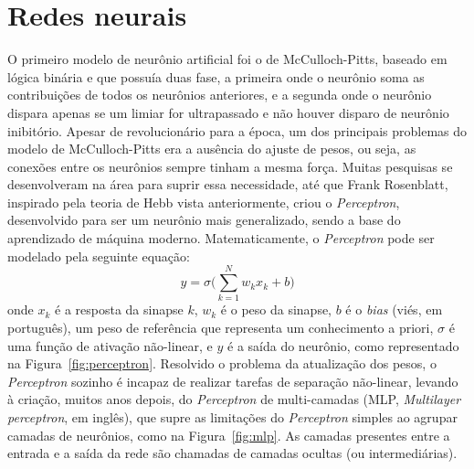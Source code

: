 \section{Redes neurais}\label{sec:redesneurais}
O primeiro modelo de neurônio artificial foi o de McCulloch-Pitts, baseado em lógica binária e que possuía duas fase, a primeira onde o neurônio soma as contribuições de todos os neurônios anteriores, e a segunda onde o neurônio dispara apenas se um limiar for ultrapassado e não houver disparo de neurônio inibitório.
Apesar de revolucionário para a época, um dos principais problemas do modelo de McCulloch-Pitts era a ausência do ajuste de pesos, ou seja, as conexões entre os neurônios sempre tinham a mesma força. Muitas pesquisas se desenvolveram na área para suprir essa necessidade, até que Frank Rosenblatt, inspirado pela teoria de Hebb vista anteriormente, criou o \textit{Perceptron},
desenvolvido para ser um neurônio mais generalizado, sendo a base do aprendizado de máquina moderno. Matematicamente, o \textit{Perceptron} pode ser modelado pela seguinte equação:
\begin{equation}\label{eq:perceptron}
	y=\sigma\Big(\sum_{k=1}^Nw_kx_k+b\Big)
\end{equation}
onde $x_k$ é a resposta da sinapse $k$, $w_k$ é o peso da sinapse, $b$ é o \textit{bias} (viés, em português), um peso de referência que representa um conhecimento a priori, %
$\sigma$ é uma função de ativação não-linear, e $y$ é a saída do neurônio, como representado na Figura~\ref{fig:perceptron}. Resolvido o problema da atualização dos pesos, o \textit{Perceptron} sozinho é incapaz de realizar tarefas de separação não-linear,
levando à criação, muitos anos depois, do \textit{Perceptron} de multi-camadas (MLP, \textit{Multilayer perceptron}, em inglês), que supre as limitações do \textit{Perceptron} simples ao agrupar camadas de neurônios, como na Figura~\ref{fig:mlp}. As camadas presentes entre a entrada e a saída da rede são chamadas de camadas ocultas (ou intermediárias).
